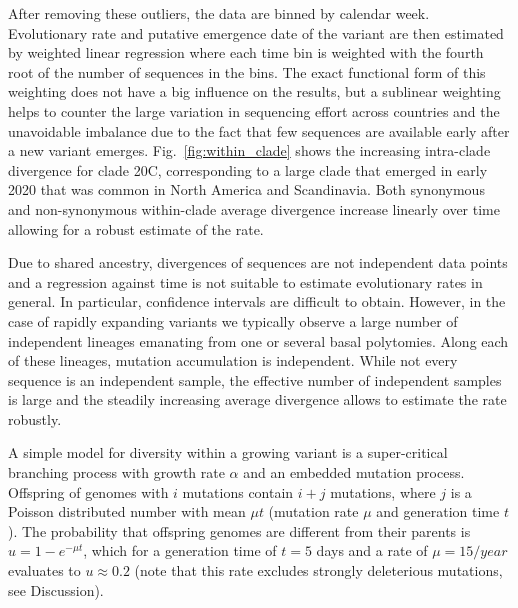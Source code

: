 \documentclass[aps,rmp, twocolumn]{revtex4}
\begin{document}
After removing these outliers, the data are binned by calendar week.
Evolutionary rate and putative emergence date of the variant are then estimated by weighted linear regression where each time bin is weighted with the fourth root of the number of sequences in the bins.
The exact functional form of this weighting does not have a big influence on the results, but a sublinear weighting helps to counter the large variation in sequencing effort across countries and the unavoidable imbalance due to the fact that few sequences are available early after a new variant emerges.
Fig.~\ref{fig:within_clade} shows the increasing intra-clade divergence for clade 20C, corresponding to a large clade that emerged in early 2020 that was common in North America and Scandinavia.
Both synonymous and non-synonymous within-clade average divergence increase linearly over time allowing for a robust estimate of the rate.

Due to shared ancestry, divergences of sequences are not independent data points and a regression against time is not suitable to estimate evolutionary rates in general.
In particular, confidence intervals are difficult to obtain.
However, in the case of rapidly expanding variants we typically observe a large number of independent lineages emanating from one or several basal polytomies.
Along each of these lineages, mutation accumulation is independent.
While not every sequence is an independent sample, the effective number of independent samples is large and the steadily increasing average divergence allows to estimate the rate robustly.

A simple model for diversity within a growing variant is a super-critical branching process with growth rate $\alpha$ and an embedded mutation process.
Offspring of genomes with $i$ mutations contain $i+j$ mutations, where $j$ is a Poisson distributed number with mean $\mu t$ (mutation rate $\mu$ and generation time $t$).
The probability that offspring genomes are different from their parents is $u = 1-e^{-\mu t}$, which for a generation time of $t=5$ days and a rate of $\mu = 15/year$ evaluates to $u\approx 0.2$ (note that this rate excludes strongly deleterious mutations, see Discussion).
\end{document}
